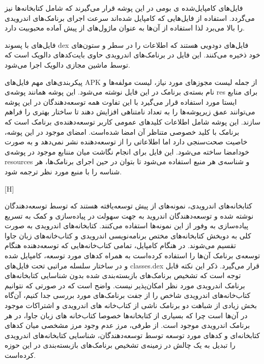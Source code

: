   فایل‌های کامپایل‌شده ی بومی در این پوشه قرار می‌گیرند که شامل کتابخانه‌ها نیز می‌گردد. استفاده از فایل‌هایی که کامپایل شده‌اند سرعت اجرای برنامک‌های اندرویدی را بالا می‌برد لذا استفاده از آن‌ها به عنوان ماژول‌های از پیش آماده محبوبیت دارد.

  فایل‌های با پسوند {dex} فایل‌های دودویی هستند که اطلاعات را در سطر و ستون‌های خود ذخیره می‌کنند. این فایل  در برنامک‌های اندرویدی حاوی بایت‌کد‌های دالویک است که توسط ماشین مجازی دالویک اجرا می‌شود.

  پیکر‌بندی‌های مهم فایل‌های APK از جمله لیست مجوز‌های مورد نیاز، لیست مولفه‌ها و نام بسته‌ی برنامک در این فایل نوشته می‌شود.
  این پوشه همانند پوشه‌ی res برای منابع ایستا مورد استفاده قرار می‌گیرد با این تفاوت همه توسعه‌دهندگان در این پوشه می‌توانند عمق زیر‌پوشه‌ها را به تعداد نامتناهی افزایش دهند تا ساختار بهتری را فراهم سازند.
  این پوشه شامل اطلاعات کلید‌‌های عمومی کاربر توسعه‌دهنده‌ی برنامک است که برنامک با کلید خصوصی متناظر آن امضا شده‌است. امضا‌ی موجود در این پوشه، خاصیت صحت‌سنجی دارد اما اطلاعاتی را از توسعه‌دهنده نشر نمی‌دهد و به صورت خود‌امضا ساخته‌ می‌شود.
  این فایل برای انجام نگاشت میان مننابع موجود در پوشه‌ی {resources} و شناسه‌ی هر منبع استفاده می‌شود تا بتوان در حین اجرای برنامک‌ها، هر شناسه‌ را با منبع مورد نظر ترجمه‌ شود.



[H]
\vspace{1em}

کتابخانه‌های اندرویدی، نمونه‌های از پیش توسعه‌یافته هستند که توسط توسعه‌دهندگان نوشته شده و توسعه‌دهندگان اندروید به جهت سهولت در پیاده‌سازی و کمک به تسریع پیاده‌سازی به وفور از این نمونه‌ها استفاده می‌کنند. کتابخانه‌های اندرویدی به صورت کلی به دوبخش کتابخانه‌های مختص برنامه‌نویسی اندرویدی و کتاب‌خانه‌های زبان جاوا تقسیم می‌شوند. در هنگام کامپایل، تمامی کتاب‌خانه‌هایی که توسعه‌دهنده هنگام توسعه‌ی برنامک آن‌ها را استفاده کرده‌است به همراه کد‌های مورد توسعه، کامپایل شده و در ساختار سلسله مراتبی تحت فایل‌های {classes.dex} قرار می‌گیرد. ذکر این نکته‌ قابل توجه است که تشخیص برنامک‌های بازبسته‌بندی شده بدون شناسایی کتابخانه‌های برنامک‌ اندرویدی مورد نظر امکان‌پذیر نیست. واضح است که در صورتی که نتوانیم کتاب‌خانه‌های اندرویدی شاخص را از جفت برنامک‌های مورد بررسی جدا کنیم، آن‌گاه بخش زیادی از شباهت دو برنامک ناشی از کتاب‌خانه های اندرویدی و اشتراکات موجود در آن‌ها است چرا که بسیاری از کتابخانه‌ها خصوصا کتاب‌خانه های زبان جاوا، در هر برنامک اندرویدی موجود است. از طرفی، مرز عدم وجود مرز مشخصی میان کد‌های کتابخانه‌ای و کد‌های مورد توسعه توسط توسعه‌دهندگان، شناسایی کتابخانه‌های اندرویدی را تبدیل به یک چالش در زمینه‌ی تشخیص برنامک‌های بازبسته‌بندی در این حوزه کرده‌است.

